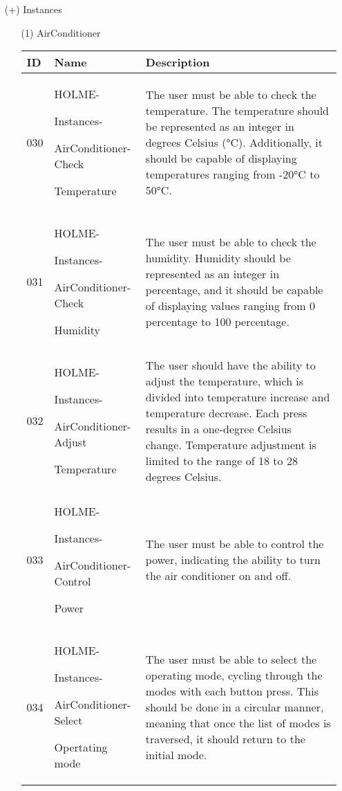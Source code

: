 \documentclass[conference]{IEEEtran}
\begin{document}
\begin{enumerate}
\item[(+)] Instances\\
\begin{itemize}
\item [(1)] AirConditioner
\begin{table}[h]
\def\arraystretch{1.2} \small
    \begin{tabular}{|p{1cm}|p{1.8cm}|p{5.0cm}|}
        \hline
        ID & Name & Description\\ \hline
         030 \par  & HOLME-\par Instances-\par AirConditioner-Check \par Temperature & The user must be able to check the temperature. The temperature should be represented as an integer in degrees Celsius (°C). Additionally, it should be capable of displaying temperatures ranging from -20°C to 50°C.\\ \hline
         031 \par  & HOLME-\par Instances-\par AirConditioner-Check \par Humidity & The user must be able to check the humidity. Humidity should be represented as an integer in percentage, and it should be capable of displaying values ranging from 0 percentage to 100 percentage.\\ \hline
         032 \par  & HOLME-\par Instances-\par AirConditioner-Adjust \par Temperature & The user should have the ability to adjust the temperature, which is divided into temperature increase and temperature decrease. Each press results in a one-degree Celsius change. Temperature adjustment is limited to the range of 18 to 28 degrees Celsius.\\ \hline
         033 \par  & HOLME-\par Instances-\par AirConditioner-Control \par Power & The user must be able to control the power, indicating the ability to turn the air conditioner on and off.\\ \hline
         034 \par  & HOLME-\par Instances-\par AirConditioner-Select \par Opertating mode & The user must be able to select the operating mode, cycling through the modes with each button press. This should be done in a circular manner, meaning that once the list of modes is traversed, it should return to the initial mode.\\ \hline

\end{tabular}
\end{table}
\end{itemize}
\end{enumerate}
\end{document}
